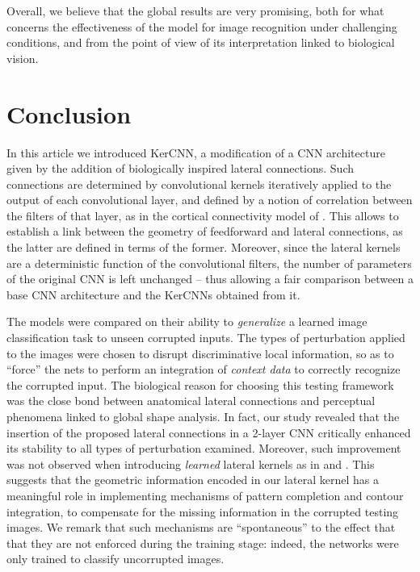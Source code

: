 \documentclass[11pt,oneside,reqno]{amsart}
\begin{document}
 Overall, we believe that the global results are very promising, both for what concerns the effectiveness of the model for image recognition under challenging conditions, and from the point of view of its interpretation linked to biological vision.

 

 
 \FloatBarrier
 
 \section{Conclusion}
  
 In this article we introduced KerCNN, a modification of a CNN architecture given by the addition of biologically inspired lateral connections. Such connections are determined by convolutional kernels iteratively applied to the output of each convolutional layer, and defined by a notion of correlation between the filters of that layer, as in the cortical connectivity model of \citet{neuro,metric}. This allows to establish a link between the geometry of feedforward and lateral connections, as the latter are defined in terms of the former. Moreover, since the lateral kernels are a deterministic function of the convolutional filters, the number of parameters of the original CNN is left unchanged -- thus allowing a fair comparison between a base CNN architecture and the KerCNNs obtained from it. 
  
 The models were compared on their ability to \emph{generalize} a learned image classification task to unseen corrupted inputs. The types of perturbation applied to the images were chosen to disrupt discriminative local information, so as to ``force'' the nets to perform an integration of \emph{context data} to correctly recognize the corrupted input. The biological reason for choosing this testing framework was the close bond between anatomical lateral connections and perceptual phenomena linked to global shape analysis. In fact, our study revealed that the insertion of the proposed lateral connections in a 2-layer CNN critically enhanced its stability to all types of perturbation examined. Moreover, such improvement was not observed when introducing \emph{learned} lateral kernels as in \citet{liang} and \citet{spoerer}. This suggests that the geometric information encoded in our lateral kernel has a meaningful role in implementing mechanisms of pattern completion and contour integration, to compensate for the missing information in the corrupted testing images. We remark that such mechanisms are ``spontaneous'' to the effect that that they are not enforced during the training stage: indeed, the networks were only trained to classify uncorrupted images.
 
\end{document}
